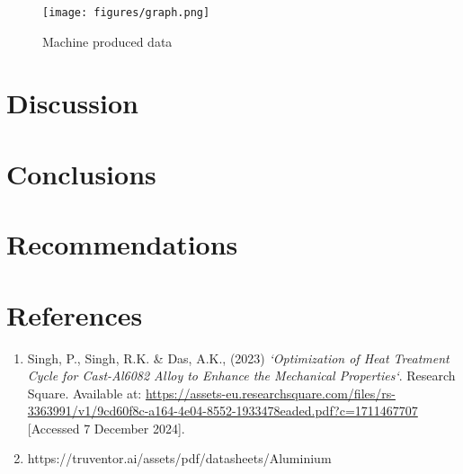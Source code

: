 \documentclass{article}
\begin{document}
    \begin{figure}[H]
        \centering
        \texttt{[image: figures/graph.png]}
        \caption{Machine produced data}
        \label{fig:stress_strain}
    \end{figure}
    
    \newpage\vspace*{-5pt}
    \section{Discussion}

    \newpage\vspace*{-5pt}
    \section{Conclusions}

    \newpage\vspace*{-5pt}
    \section{Recommendations}

    \newpage\vspace*{-5pt}
    \section{References}
    \begin{enumerate}
        \item Singh, P., Singh, R.K. \& Das, A.K., (2023) \textit{‘Optimization of Heat Treatment Cycle for Cast-Al6082 Alloy to Enhance the Mechanical Properties‘}. Research Square. Available at: 	\url{https://assets-eu.researchsquare.com/files/rs-3363991/v1/9cd60f8c-a164-4e04-8552-1933478eaded.pdf?c=1711467707} [Accessed 7 December 2024]. 
        
        \item https://truventor.ai/assets/pdf/datasheets/Aluminium%
        
    \end{enumerate}
    
    
    

    \newpage\vspace*{-5pt}
    
\end{document}

